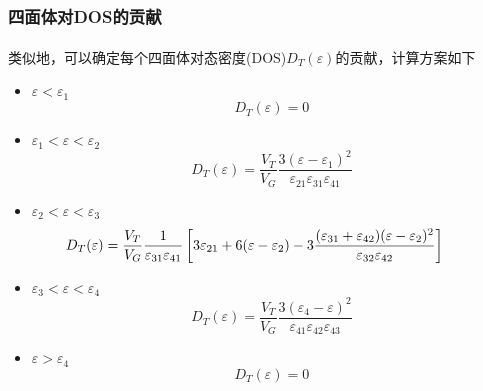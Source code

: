 \documentclass[cjk,slidestop,compress,mathserif,blue]{beamer}
\newcommand{\upcite}[1]{\hspace{0ex}\textsuperscript{\cite{#1}}} %
\begin{document}
\frame
{
	\frametitle{四面体对\textrm{DOS}的贡献}
	类似地，可以确定每个四面体对态密度(\textrm{DOS})$D_T(\varepsilon)$的贡献，计算方案如下\upcite{PRB49-16233_1994}
	\begin{itemize}
	\item $\varepsilon<\varepsilon_1$
		\begin{displaymath}
			D_T(\varepsilon)=0
		\end{displaymath}
	\item $\varepsilon_1<\varepsilon<\varepsilon_2$
		\begin{displaymath}
			D_T(\varepsilon)=\dfrac{V_T}{V_G}\dfrac{3(\varepsilon-\varepsilon_1)^2}{\varepsilon_{21}\varepsilon_{31}\varepsilon_{41}}
		\end{displaymath}
	\item $\varepsilon_2<\varepsilon<\varepsilon_3$
		\begin{displaymath}
			\hspace*{-25pt}	D_T(\varepsilon)=\dfrac{V_T}{V_G}\dfrac1{\varepsilon_{31}\varepsilon_{41}}\left[3\varepsilon_{21}+6(\varepsilon-\varepsilon_2)-3\dfrac{(\varepsilon_{31}+\varepsilon_{42})(\varepsilon-\varepsilon_2)^2}{\varepsilon_{32}\varepsilon_{42}}\right]
		\end{displaymath}
	\item $\varepsilon_3<\varepsilon<\varepsilon_4$
		\begin{displaymath}
			D_T(\varepsilon)=\dfrac{V_T}{V_G}\dfrac{3(\varepsilon_4-\varepsilon)^2}{\varepsilon_{41}\varepsilon_{42}\varepsilon_{43}}
		\end{displaymath}
	\item $\varepsilon>\varepsilon_4$
		\begin{displaymath}
			D_T(\varepsilon)=0
		\end{displaymath}
	\end{itemize}
}

\end{document}
